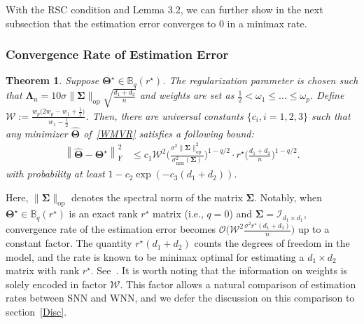 \documentclass[12pt]{article}
\newtheorem{theorem}{Theorem}[section]
\begin{document}
With the RSC condition and Lemma 3.2, we can further show in the next subsection that the estimation error converges to $0$ in a minimax rate.

\subsubsection{Convergence Rate of Estimation Error}
\begin{theorem} \label{thm2}
Suppose $\boldsymbol{\Theta^{\star}}\in\mathbb{B}_{q}(r^{\star})$.
The regularization parameter is chosen such that $\boldsymbol{\Lambda}_{n}=10\sigma\|\boldsymbol{\Sigma}\|_{\text{op}} \sqrt{\frac{d_{1}+d_{2}}{n}}$ and weights are set 
as $\frac{1}{2} < \omega_{1} \leq \dots \leq \omega_{p}$.
Define $\mathcal{W}:=\frac{w_{p}\big(2w_{p}-w_{1}+\frac{1}{2}\big)}{w_{1}-\frac{1}{2}}$.
Then, there are universal constants $\{c_{i},i=1,2,3\}$ such that any minimizer $\boldsymbol{\widehat{\boldsymbol{\Theta}}}$ of~\eqref{WMVR} satisfies a following bound:
\begin{align} \label{Rate}
    \left\| \widehat{\boldsymbol{\Theta}} - \boldsymbol{\Theta^{\star}} \right\|_{\text{F}}^{2}
    &\leq c_{1} \mathcal{W}^{2} \Bigg( \frac{\sigma^{2}\|\boldsymbol{\Sigma}\|_{\text{op}}^{2}}{\sigma_{\text{min}}^{2}(\boldsymbol{\Sigma})} \Bigg)^{1-q/2} 
    \cdot r^{\star} \Bigg( \frac{d_{1}+d_{2}}{n} \Bigg)^{1-q/2}.
\end{align}
with probability at least $1-c_{2}\exp(-c_{3}(d_{1}+d_{2}))$.
\end{theorem}

Here, $\|\boldsymbol{\Sigma}\|_{\text{op}}$ denotes the spectral norm of the matrix $\boldsymbol{\Sigma}$. 
Notably, when $\boldsymbol{\Theta^{\star}}\in\mathbb{B}_{q}(r^{\star})$ is an exact rank $r^{\star}$ matrix (i.e., $q=0$) and $\boldsymbol{\Sigma} = \mathcal{I}_{d_{1} \times d_{1}}$, 
convergence rate of the estimation error becomes $\mathcal{O}\big( \mathcal{W}^{2} \frac{ \sigma^{2} r^{\star} (d_{1}+d_{2}) }{n} \big)$ up to a constant factor.
The quantity $r^{\star} (d_{1}+d_{2})$ counts the degrees of freedom in the model, and the rate is known to be minimax optimal for estimating a $d_{1} \times d_{2}$ matrix with rank $r^{\star}$.
See~\citet{negahban2011estimation,koltchinskii2011nuclear,rohde2011estimation}.
It is worth noting that the information on weights is solely encoded in factor $\mathcal{W}$.
This factor allows a natural comparison of estimation rates between SNN and WNN, and we defer the discussion on this comparison to section~\ref{Disc}.
\end{document}
